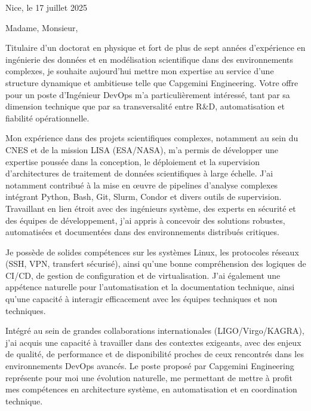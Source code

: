 \documentclass[10pt,a4paper]{../_shared/altacv}
\begin{document}
\makecvheader





{\color{body}
\iffalse
Nice, le 17 juillet 2025

Madame, Monsieur,

Titulaire d'un doctorat en physique et fort de plus de sept années d'expérience en ingénierie des données et en modélisation scientifique dans des environnements complexes, je souhaite aujourd'hui mettre mon expertise au service d'une structure dynamique et ambitieuse telle que Capgemini Engineering. Votre offre pour un poste d'Ingénieur DevOps m'a particulièrement intéressé, tant par sa dimension technique que par sa transversalité entre R\&D, automatisation et fiabilité opérationnelle.

Mon expérience dans des projets scientifiques complexes, notamment au sein du CNES et de la mission LISA (ESA/NASA), m'a permis de développer une expertise poussée dans la conception, le déploiement et la supervision d'architectures de traitement de données scientifiques à large échelle. J'ai notamment contribué à la mise en œuvre de pipelines d'analyse complexes intégrant Python, Bash, Git, Slurm, Condor et divers outils de supervision. Travaillant en lien étroit avec des ingénieurs système, des experts en sécurité et des équipes de développement, j'ai appris à concevoir des solutions robustes, automatisées et documentées dans des environnements distribués critiques.

Je possède de solides compétences sur les systèmes Linux, les protocoles réseaux (SSH, VPN, transfert sécurisé), ainsi qu'une bonne compréhension des logiques de CI/CD, de gestion de configuration et de virtualisation. J'ai également une appétence naturelle pour l'automatisation et la documentation technique, ainsi qu'une capacité à interagir efficacement avec les équipes techniques et non techniques.

Intégré au sein de grandes collaborations internationales (LIGO/Virgo/KAGRA), j'ai acquis une capacité à travailler dans des contextes exigeants, avec des enjeux de qualité, de performance et de disponibilité proches de ceux rencontrés dans les environnements DevOps avancés. Le poste proposé par Capgemini Engineering représente pour moi une évolution naturelle, me permettant de mettre à profit mes compétences en architecture système, en automatisation et en coordination technique.

}
\end{document}
